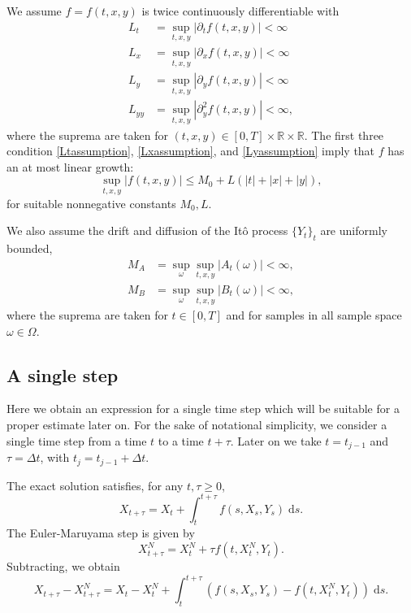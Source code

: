 \documentclass[reqno,12pt]{amsart}
\theoremstyle{plain}%
\theoremstyle{definition}
\begin{document}
We assume $f=f(t, x, y)$ is twice continuously differentiable with
\begin{align}
  \label{Ltassumption} L_t & = \sup_{t, x, y} |\partial_t f(t, x, y)| < \infty \\
  \label{Lxassumption} L_x & = \sup_{t, x, y} |\partial_x f(t, x, y)| < \infty \\
  \label{Lyassumption} L_y & = \sup_{t, x, y} |\partial_y f(t, x, y)| < \infty \\
  \label{Lyyassumption} L_{yy} & = \sup_{t, x, y} |\partial_y^2 f(t, x, y)| < \infty,
\end{align}
where the suprema are taken for $(t, x, y) \in [0, T] \times \mathbb{R} \times \mathbb{R}$. The first three condition \eqref{Ltassumption}, \eqref{Lxassumption}, and \eqref{Lyassumption} imply that $f$ has an at most linear growth:
\begin{equation}
    \label{Mfassumption}
    \sup_{t, x, y} |f(t, x, y)| \leq M_0 + L(|t| + |x| + |y|),
\end{equation}
for suitable nonnegative constants $M_0, L$.

We also assume the drift and diffusion of the It\^o process $\{Y_t\}_t$ are uniformly bounded,
\begin{align}
  \label{MAassumption} M_A & = \sup_\omega \sup_{t, x, y} |A_t(\omega)| < \infty, \\
  \label{MBassumption} M_B & = \sup_\omega\sup_{t, x, y} |B_t(\omega)| < \infty,
\end{align}
where the suprema are taken for $t\in [0, T]$ and for samples in all sample space $\omega\in \Omega$.

\subsection{A single step}

Here we obtain an expression for a single time step which will be suitable for a proper estimate later on. For the sake of notational simplicity, we consider a single time step from a time $t$ to a time $t + \tau$. Later on we take $t=t_{j-1}$ and $\tau = \Delta t$, with $t_j = t_{j-1}+\Delta t$.

The exact solution satisfies, for any $t, \tau \geq 0$, 
$$
X_{t + \tau} = X_t + \int_t^{t + \tau} f(s, X_s, Y_s) \;\mathrm{d}s.
$$
The Euler-Maruyama step is given by
$$
X_{t+\tau}^N = X_t^N + \tau f(t, X_t^N, Y_t).
$$
Subtracting, we obtain
$$
X_{t + \tau} - X_{t + \tau}^N = X_t - X_t^N + \int_t^{t + \tau} \left( f(s, X_s, Y_s) - f(t, X_t^N, Y_t) \right)\;\mathrm{d}s.
$$
\end{document}
